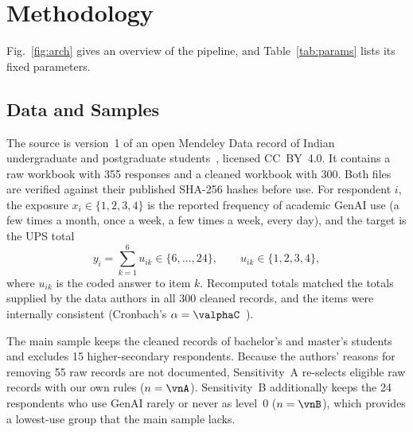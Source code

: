 \section{Methodology}\label{sec:method}

Fig.~\ref{fig:arch} gives an overview of the pipeline, and Table~\ref{tab:params} lists its fixed parameters.

\subsection{Data and Samples}\label{sec:data}
The source is version~1 of an open Mendeley Data record of Indian undergraduate and postgraduate students~\cite{sharma2026dataset}, licensed CC~BY~4.0. It contains a raw workbook with 355 responses and a cleaned workbook with 300. Both files are verified against their published SHA-256 hashes before use. For respondent $i$, the exposure $x_i\in\{1,2,3,4\}$ is the reported frequency of academic GenAI use (a few times a month, once a week, a few times a week, every day), and the target is the UPS total
\begin{equation}
y_i=\sum_{k=1}^{6}u_{ik}\in\{6,\dots,24\},\qquad u_{ik}\in\{1,2,3,4\}, \label{eq:ups}
\end{equation}
where $u_{ik}$ is the coded answer to item $k$. Recomputed totals matched the totals supplied by the data authors in all 300 cleaned records, and the items were internally consistent (Cronbach's $\alpha=\valphaC$~\cite{cronbach1951alpha}).

The main sample keeps the \vnMain{} cleaned records of bachelor's and master's students and excludes 15 higher-secondary respondents. Because the authors' reasons for removing 55 raw records are not documented, Sensitivity~A re-selects eligible raw records with our own rules ($n=\vnA$). Sensitivity~B additionally keeps the 24 respondents who use GenAI rarely or never as level~0 ($n=\vnB$), which provides a lowest-use group that the main sample lacks.

